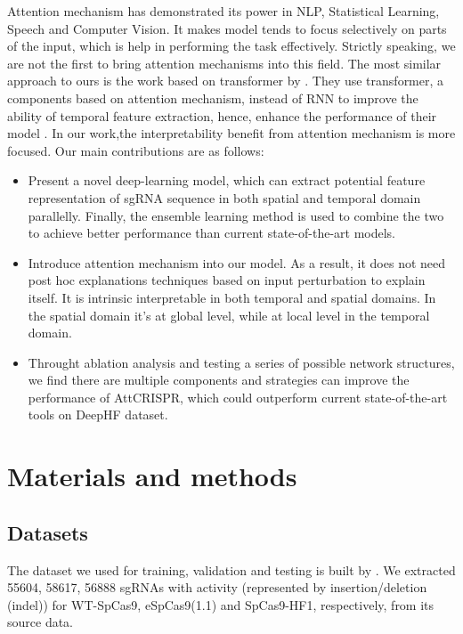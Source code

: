 \documentclass{bioinfo}
\begin{document}
Attention mechanism has demonstrated its power in NLP, Statistical Learning, Speech and Computer Vision. 
 It makes model tends to focus selectively on parts of the input, which is help in performing the task effectively. 
 Strictly speaking, we are not the first to bring attention mechanisms into this field. 
 The most similar approach to ours is the work based on transformer by \citeauthor{Liu2019}. 
 They use transformer, a components based on attention mechanism, instead of RNN to improve the ability of temporal feature extraction, 
 hence, enhance the performance of their model \citep{vaswani2017attention,Liu2019}. 
 In our work,the interpretability benefit from attention mechanism is more focused. 
 Our main contributions are as follows:\vspace*{1pt}
\begin{itemize}
    \item Present a novel deep-learning model, which can extract potential feature representation of sgRNA sequence in both spatial and temporal domain parallelly. 
    Finally, the ensemble learning method is used to combine the two to achieve better performance than current state-of-the-art models. 
    \item Introduce attention mechanism into our model. 
    As a result, it does not need post hoc explanations techniques based on input perturbation to explain itself. 
    It is intrinsic interpretable in both temporal and spatial domains.
    In the spatial domain it's at global level, while at local level in the temporal domain. 
    \item Throught ablation analysis and testing a series of possible network structures, 
    we find there are multiple components and strategies can improve the performance of AttCRISPR, 
    which could outperform current state-of-the-art tools on DeepHF dataset.\vspace*{1pt}
\end{itemize}

\section{Materials and methods}
\subsection{Datasets}

The dataset we used for training, validation and testing is built by \citeauthor{wang2019optimized}. 
We extracted 55604, 58617, 56888 sgRNAs with activity (represented by insertion/deletion (indel)) for WT-SpCas9, eSpCas9(1.1) and SpCas9-HF1, respectively, from its source data. 
\end{document}
